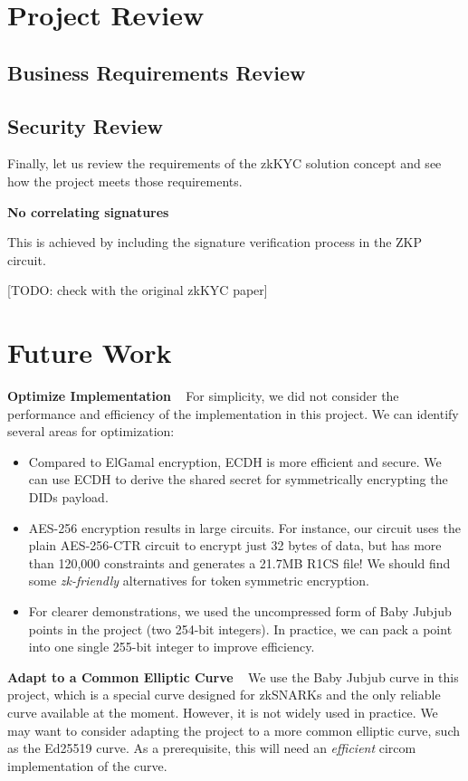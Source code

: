 \documentclass[
]{report}
\providecommand{\tightlist}{%
  \setlength{\itemsep}{0pt}\setlength{\parskip}{0pt}}
\begin{document}
\chapter{Project Review}
\section{Business Requirements Review}
\section{Security Review}

Finally, let us review the requirements of the zkKYC solution concept
and see how the project meets those requirements.

\textbf{No correlating signatures}

This is achieved by including the signature verification process in the
ZKP circuit.

{[}TODO: check with the original zkKYC paper{]}

\chapter{Future Work}

\textbf{Optimize Implementation} ~ For simplicity, we did not consider
the performance and efficiency of the implementation in this project. We
can identify several areas for optimization:

\begin{itemize}
\tightlist
\item
  Compared to ElGamal encryption, ECDH is more efficient and secure. We
  can use ECDH to derive the shared secret for symmetrically encrypting
  the DIDs payload.
\item
  AES-256 encryption results in large circuits. For instance, our
  circuit uses the plain AES-256-CTR circuit to encrypt just 32 bytes of
  data, but has more than 120,000 constraints and generates a 21.7MB
  R1CS file! We should find some \emph{zk-friendly} alternatives for
  token symmetric encryption.
\item
  For clearer demonstrations, we used the uncompressed form of Baby
  Jubjub points in the project (two 254-bit integers). In practice, we
  can pack a point into one single 255-bit integer to improve
  efficiency.
\end{itemize}

\textbf{Adapt to a Common Elliptic Curve} ~ We use the Baby Jubjub curve
in this project, which is a special curve designed for zkSNARKs and the
only reliable curve available at the moment. However, it is not widely
used in practice. We may want to consider adapting the project to a more
common elliptic curve, such as the Ed25519 curve. As a prerequisite,
this will need an \emph{efficient} circom implementation of the curve.
\end{document}
